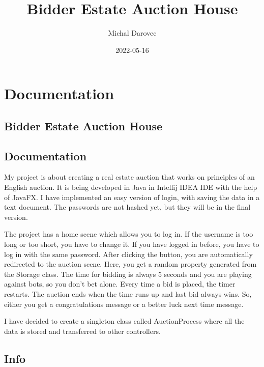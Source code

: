 \documentclass[
]{report}
\title{Bidder Estate Auction House}
\author{Michal Darovec}
\date{2022-05-16}
\begin{document}
\maketitle

{
\setcounter{tocdepth}{1}
\tableofcontents
}
\hypertarget{documentation}{%
\chapter{Documentation}\label{documentation}}

\hypertarget{bidder-estate-auction-house}{%
\section{Bidder Estate Auction House}\label{bidder-estate-auction-house}}

\hypertarget{documentation-1}{%
\section{Documentation}\label{documentation-1}}

My project is about creating a real estate auction that works on principles of an English auction. It is being developed in Java in Intellij IDEA IDE with the help of JavaFX. I have implemented an easy version of login, with saving the data in a text document. The passwords are not hashed yet, but they will be in the final version.

The project has a home scene which allows you to log in. If the username is too long or too short, you have to change it. If you have logged in before, you have to log in with the same password. After clicking the button, you are automatically redirected to the auction scene. Here, you get a random property generated from the Storage class. The time for bidding is always 5 seconds and you are playing against bots, so you don't bet alone. Every time a bid is placed, the timer restarts. The auction ends when the time runs up and last bid always wins. So, either you get a congratulations message or a better luck next time message.

I have decided to create a singleton class called AuctionProcess where all the data is stored and transferred to other controllers.

\hypertarget{info}{%
\section{Info}\label{info}}
\end{document}
